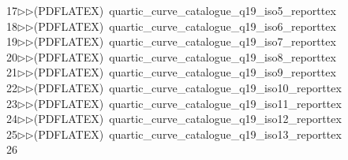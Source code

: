 \begin{tabbing}
17\>$\triangleright$\>$\triangleright$\>(PDFLATEX)\ quartic\_curve\_catalogue\_q19\_iso5\_reporttex\\[0pt]
18\>$\triangleright$\>$\triangleright$\>(PDFLATEX)\ quartic\_curve\_catalogue\_q19\_iso6\_reporttex\\[0pt]
19\>$\triangleright$\>$\triangleright$\>(PDFLATEX)\ quartic\_curve\_catalogue\_q19\_iso7\_reporttex\\[0pt]
20\>$\triangleright$\>$\triangleright$\>(PDFLATEX)\ quartic\_curve\_catalogue\_q19\_iso8\_reporttex\\[0pt]
21\>$\triangleright$\>$\triangleright$\>(PDFLATEX)\ quartic\_curve\_catalogue\_q19\_iso9\_reporttex\\[0pt]
22\>$\triangleright$\>$\triangleright$\>(PDFLATEX)\ quartic\_curve\_catalogue\_q19\_iso10\_reporttex\\[0pt]
23\>$\triangleright$\>$\triangleright$\>(PDFLATEX)\ quartic\_curve\_catalogue\_q19\_iso11\_reporttex\\[0pt]
24\>$\triangleright$\>$\triangleright$\>(PDFLATEX)\ quartic\_curve\_catalogue\_q19\_iso12\_reporttex\\[0pt]
25\>$\triangleright$\>$\triangleright$\>(PDFLATEX)\ quartic\_curve\_catalogue\_q19\_iso13\_reporttex\\[0pt]
26\>\end{tabbing}
